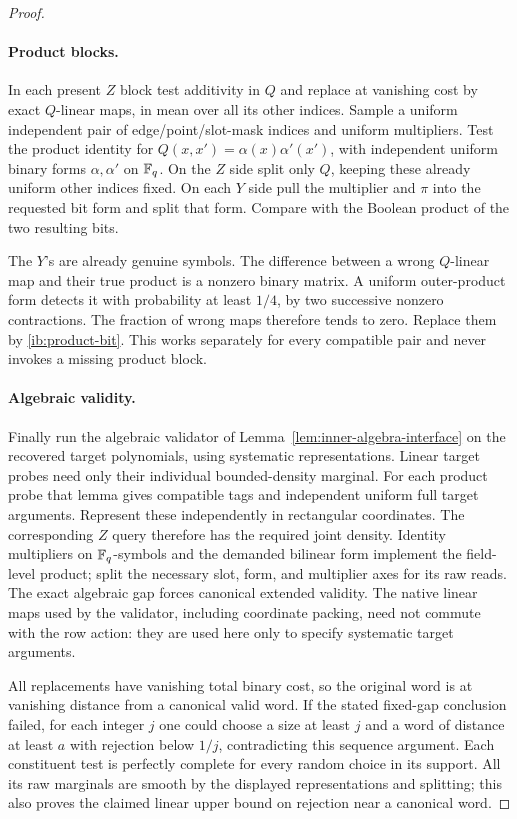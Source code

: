 \begin{proof}
\paragraph{Product blocks.}
In each present \(Z\) block test additivity in \(Q\) and replace
at vanishing cost by exact \(Q\)-linear maps, in mean over all its
other indices.  Sample a uniform independent pair of
edge/point/slot-mask indices and uniform multipliers.  Test the
product identity for
\(Q(x,x')=\alpha(x)\alpha'(x')\), with independent uniform
binary forms \(\alpha,\alpha'\) on \(\mathbb{F}_q\).
On the \(Z\) side split only \(Q\), keeping these already uniform
other indices fixed.  On each \(Y\) side pull the multiplier and
\(\pi\) into the requested bit form and split that form.  Compare
with the Boolean product of the two resulting bits.

The \(Y\)'s are already genuine symbols.  The difference between
a wrong \(Q\)-linear map and their true product is a nonzero binary
matrix.  A uniform outer-product form detects it with probability
at least \(1/4\), by two successive nonzero contractions.  The
fraction of wrong maps therefore tends to zero.  Replace them by
\eqref{ib:product-bit}.  This works separately for every compatible
pair and never invokes a missing product block.

\paragraph{Algebraic validity.}
Finally run the algebraic validator of
Lemma~\ref{lem:inner-algebra-interface} on the recovered target
polynomials, using systematic representations.  Linear target
probes need only their individual bounded-density marginal.  For
each product probe that lemma gives compatible tags and independent
uniform full target arguments.  Represent these independently in
rectangular coordinates.  The corresponding \(Z\) query therefore
has the required joint density.  Identity multipliers on
\(\mathbb{F}_q\)-symbols and the demanded bilinear form implement the
field-level product; split the necessary slot, form, and multiplier
axes for its raw reads.  The exact algebraic gap forces canonical
extended validity.  The native linear maps used by the validator,
including coordinate packing, need not commute with the row action:
they are used here only to specify systematic target arguments.

All replacements have vanishing total binary cost, so the original
word is at vanishing distance from a canonical valid word.  If the
stated fixed-gap conclusion failed, for each integer \(j\) one
could choose a size at least \(j\) and a word of distance at least
\(a\) with rejection below \(1/j\), contradicting this sequence
argument.  Each constituent test is perfectly complete for every
random choice in its support.  All its raw marginals are smooth by
the displayed representations and splitting; this also proves the
claimed linear upper bound on rejection near a canonical word.


\end{proof}
